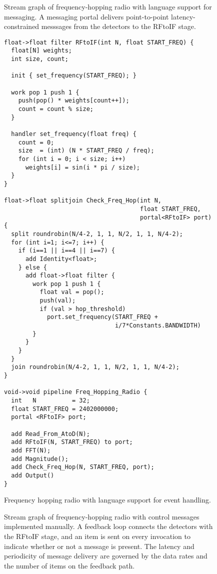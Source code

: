 \clearpage
\begin{figure}[t]
\caption{\small Stream graph of frequency-hopping radio with language
support for messaging.  A messaging portal delivers point-to-point
latency-constrained messsages from the detectors to the RFtoIF stage.
\protect\label{fig:fhr-streamit}}
\end{figure}

\begin{figure}[t]
\scriptsize
\begin{verbatim}
float->float filter RFtoIF(int N, float START_FREQ) {
  float[N] weights;
  int size, count;
  
  init { set_frequency(START_FREQ); }
  
  work pop 1 push 1 {
    push(pop() * weights[count++]);
    count = count % size;
  }
  
  handler set_frequency(float freq) {
    count = 0;
    size  = (int) (N * START_FREQ / freq);
    for (int i = 0; i < size; i++)
      weights[i] = sin(i * pi / size);
  }
}

float->float splitjoin Check_Freq_Hop(int N, 
                                      float START_FREQ, 
                                      portal<RFtoIF> port) {
  split roundrobin(N/4-2, 1, 1, N/2, 1, 1, N/4-2);
  for (int i=1; i<=7; i++) {
    if (i==1 || i==4 || i==7) {
      add Identity<float>;
    } else {
      add float->float filter {
        work pop 1 push 1 {
          float val = pop();
          push(val);
          if (val > hop_threshold)
            port.set_frequency(START_FREQ + 
                               i/7*Constants.BANDWIDTH)
        }
      }
    }
  }
  join roundrobin(N/4-2, 1, 1, N/2, 1, 1, N/4-2);
}

void->void pipeline Freq_Hopping_Radio {
  int   N          = 32;
  float START_FREQ = 2402000000;
  portal <RFtoIF> port;

  add Read_From_AtoD(N);
  add RFtoIF(N, START_FREQ) to port;
  add FFT(N);
  add Magnitude();
  add Check_Freq_Hop(N, START_FREQ, port);
  add Output()
}
\end{verbatim}
\vspace{-12pt}
\caption{\small Frequency hopping radio with language support for event handling. \protect\label{fig:freq1}}
\end{figure}

\clearpage
\begin{figure}[t]
\caption{\small Stream graph of frequency-hopping radio with control
messages implemented manually.  A feedback loop connects the detectors
with the RFtoIF stage, and an item is sent on every invocation to
indicate whether or not a message is present.  The latency and
periodicity of message delivery are governed by the data rates and the
number of items on the feedback
path. \protect\label{fig:fhr-streamit}}
\end{figure}

